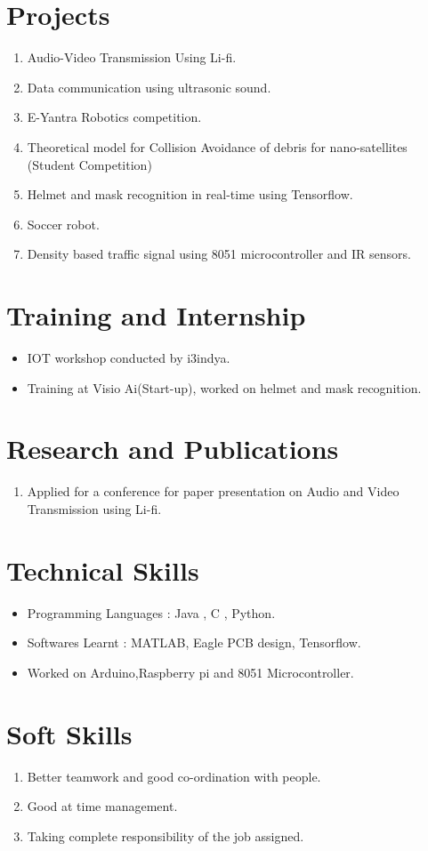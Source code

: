 \documentclass{article}
\begin{document}
	\section{Projects}
	\begin{enumerate}
		\item Audio-Video Transmission Using Li-fi.
		\item Data communication using ultrasonic sound.
		\item E-Yantra Robotics competition.
		\item Theoretical model for Collision Avoidance of debris for nano-satellites (Student Competition)
		\item Helmet and mask recognition in real-time using Tensorflow.
		\item Soccer robot.
		\item Density based traffic signal using 8051 microcontroller and IR sensors.
	\end{enumerate}

	\section{Training and Internship}
	\begin{itemize}
		\item IOT workshop conducted by i3indya.
		\item Training at Visio Ai(Start-up), worked on helmet and mask recognition.
	\end{itemize}

	\section{Research and Publications}
	\begin{enumerate}
		\item Applied for a conference for paper presentation on Audio and Video Transmission using Li-fi.
	\end{enumerate}

	\section{Technical Skills}
	\begin{itemize}
		\item Programming Languages : Java , C , Python.
		\item Softwares Learnt : MATLAB, Eagle PCB design, Tensorflow.
		\item Worked on Arduino,Raspberry pi and 8051 Microcontroller.
	\end{itemize}

	\section{Soft Skills}
	\begin{enumerate}
		\item Better teamwork and good co-ordination with people.
		\item Good at time management.
		\item Taking complete responsibility of the job assigned.
	\end{enumerate}
\end{document}

